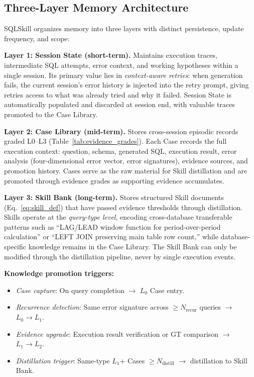 \subsection{Three-Layer Memory Architecture}
\label{subsec:memory}

SQLSkill organizes memory into three layers with distinct persistence, update frequency, and scope:

\textbf{Layer 1: Session State (short-term).} Maintains execution traces, intermediate SQL attempts, error context, and working hypotheses within a single session. Its primary value lies in \emph{context-aware retries}: when generation fails, the current session's error history is injected into the retry prompt, giving retries access to what was already tried and why it failed. Session State is automatically populated and discarded at session end, with valuable traces promoted to the Case Library.

\textbf{Layer 2: Case Library (mid-term).} Stores cross-session episodic records graded L0--L3 (Table~\ref{tab:evidence_grades}). Each Case records the full execution context: question, schema, generated SQL, execution result, error analysis (four-dimensional error vector, error signatures), evidence sources, and promotion history. Cases serve as the raw material for Skill distillation and are promoted through evidence grades as supporting evidence accumulates.

\textbf{Layer 3: Skill Bank (long-term).} Stores structured Skill documents (Eq.~\ref{eq:skill_def}) that have passed evidence thresholds through distillation. Skills operate at the \emph{query-type level}, encoding cross-database transferable patterns such as ``LAG/LEAD window function for period-over-period calculation'' or ``LEFT JOIN preserving main table row count,'' while database-specific knowledge remains in the Case Library. The Skill Bank can only be modified through the distillation pipeline, never by single execution events.

\textbf{Knowledge promotion triggers:}
\begin{itemize}
  \item \emph{Case capture}: On query completion $\to$ $L_0$ Case entry.
  \item \emph{Recurrence detection}: Same error signature across $\geq N_{\text{recur}}$ queries $\to$ $L_0 \to L_1$.
  \item \emph{Evidence upgrade}: Execution result verification or GT comparison $\to$ $L_1 \to L_2$.
  \item \emph{Distillation trigger}: Same-type $L_1$+ Cases $\geq N_{\text{distill}}$ $\to$ distillation to Skill Bank.
\end{itemize}

